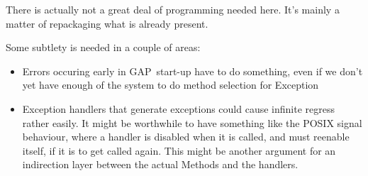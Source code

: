 \documentclass{article}
\def\GAP{\textsf{GAP}}
\begin{document}
There is actually not a great deal of programming needed here. It's
mainly a matter of repackaging what is already present.

Some subtlety is needed in a couple of areas:
\begin{itemize}
\item Errors occuring early in \GAP\ start-up have to do something,
even if we don't yet have enough of the system to do method selection
for Exception
\item Exception handlers that generate exceptions could cause infinite 
regress rather easily. It might be worthwhile to have something like
the POSIX signal behaviour, where a handler is disabled when it is
called, and must reenable itself, if it is to get called again. This
might be another argument for an indirection layer between the actual
Methods and the handlers.
\end{itemize}
\end{document}
